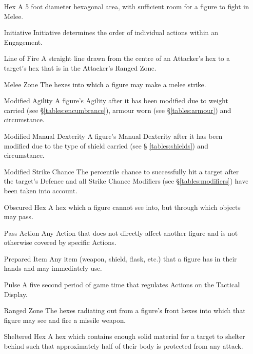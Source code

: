 \begin{multicols*}{3}
\begin{Description}
\item[Hex] A 5 foot diameter hexagonal area, with sufficient room for a figure
to fight in Melee.

\item[Initiative] Initiative determines the order of individual
actions within an Engagement.

\item[Line of Fire] A straight line drawn from the centre of an Attacker's
hex to a target's hex that is in the Attacker's Ranged Zone.

\item[Melee Zone] The hexes into which a figure may make a melee
strike.

\item[Modified Agility] A figure's Agility after it has been modified
due to weight carried (see \S \ref{tables:encumbrance}), armour worn (see
\S \ref{tables:armour}) and circumstance.

\item[Modified Manual Dexterity] A figure's Manual Dexterity after it
has been modified due to the type of shield carried (see \S
\ref{tables:shields}) and circumstance.

\item[Modified Strike Chance] The percentile chance to successfully
hit a target after the target's Defence and all Strike Chance
Modifiers (see \S \ref{tables:modifiers}) have been taken into
account.

\item[Obscured Hex] A hex which a figure cannot see into, but through which
objects may pass.

\item[Pass Action] Any Action that does not directly affect another
figure and is not otherwise covered by specific Actions.

\item[Prepared Item] Any item (weapon, shield, flask, etc.) that a figure
has in their hands and may immediately use.

\item[Pulse] A five second period of game time that regulates Actions on the
Tactical Display.

\item[Ranged Zone] The hexes radiating out from a figure's front hexes into
which that figure may see and fire a missile weapon.

\item[Sheltered Hex] A hex which contains enough solid material for a target
to shelter behind such that approximately half of their body is
protected from any attack.


\end{Description}
\end{multicols*}
